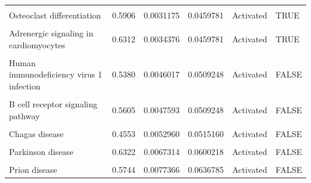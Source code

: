 \documentclass[9pt,a4paper,]{extarticle}
\begin{document}
\begin{table}
{\begin{tabular}[t]{lrrrll}
\cellcolor{gray!6}{Relaxin signaling pathway} & \cellcolor{gray!6}{0.5105} & \cellcolor{gray!6}{0.0027843} & \cellcolor{gray!6}{0.0458335} & \cellcolor{gray!6}{Activated} & \cellcolor{gray!6}{TRUE}\\
Osteoclast differentiation & 0.5906 & 0.0031175 & 0.0459781 & Activated & TRUE\\
\cellcolor{gray!6}{Th17 cell differentiation} & \cellcolor{gray!6}{0.6178} & \cellcolor{gray!6}{0.0032525} & \cellcolor{gray!6}{0.0459781} & \cellcolor{gray!6}{Activated} & \cellcolor{gray!6}{TRUE}\\
\addlinespace
Adrenergic signaling in cardiomyocytes & 0.6312 & 0.0034376 & 0.0459781 & Activated & TRUE\\
\cellcolor{gray!6}{Rheumatoid arthritis} & \cellcolor{gray!6}{0.5555} & \cellcolor{gray!6}{0.0044125} & \cellcolor{gray!6}{0.0509248} & \cellcolor{gray!6}{Activated} & \cellcolor{gray!6}{FALSE}\\
Human immunodeficiency virus 1 infection & 0.5380 & 0.0046017 & 0.0509248 & Activated & FALSE\\
\cellcolor{gray!6}{Leukocyte transendothelial migration} & \cellcolor{gray!6}{0.5401} & \cellcolor{gray!6}{0.0047306} & \cellcolor{gray!6}{0.0509248} & \cellcolor{gray!6}{Activated} & \cellcolor{gray!6}{FALSE}\\
B cell receptor signaling pathway & 0.5605 & 0.0047593 & 0.0509248 & Activated & FALSE\\
\addlinespace
\cellcolor{gray!6}{Fluid shear stress and atherosclerosis} & \cellcolor{gray!6}{0.5416} & \cellcolor{gray!6}{0.0050961} & \cellcolor{gray!6}{0.0515160} & \cellcolor{gray!6}{Activated} & \cellcolor{gray!6}{FALSE}\\
Chagas disease & 0.4553 & 0.0052960 & 0.0515160 & Activated & FALSE\\
\cellcolor{gray!6}{Amphetamine addiction} & \cellcolor{gray!6}{0.4969} & \cellcolor{gray!6}{0.0066948} & \cellcolor{gray!6}{0.0600218} & \cellcolor{gray!6}{Activated} & \cellcolor{gray!6}{FALSE}\\
Parkinson disease & 0.6322 & 0.0067314 & 0.0600218 & Activated & FALSE\\
\cellcolor{gray!6}{Chemical carcinogenesis - reactive oxygen species} & \cellcolor{gray!6}{0.4914} & \cellcolor{gray!6}{0.0076541} & \cellcolor{gray!6}{0.0636785} & \cellcolor{gray!6}{Activated} & \cellcolor{gray!6}{FALSE}\\
\addlinespace
Prion disease & 0.5744 & 0.0077366 & 0.0636785 & Activated & FALSE\\

\end{tabular}}
\end{table}
\end{document}
